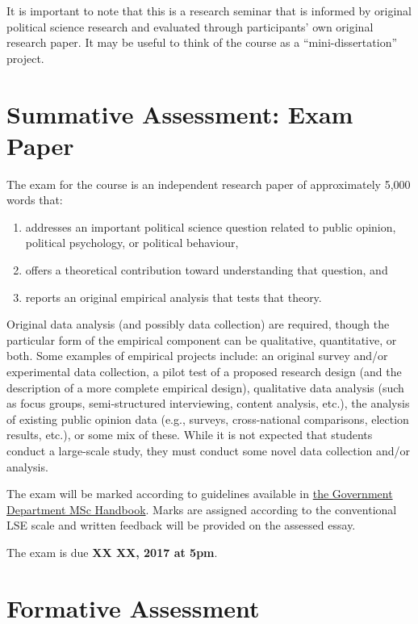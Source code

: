 \documentclass[12pt,a4paper]{article}
\begin{document}
\noindent It is important to note that this is a research seminar that is informed by original political science research and evaluated through participants' own original research paper. It may be useful to think of the course as a ``mini-dissertation'' project.

\section{Summative Assessment: Exam Paper}

The exam for the course is an independent research paper of approximately 5,000 words that:

\begin{enumerate}
\item addresses an important political science question related to public opinion, political psychology, or political behaviour,
\item offers a theoretical contribution toward understanding that question, and 
\item reports an original empirical analysis that tests that theory.
\end{enumerate}

Original data analysis (and possibly data collection) are required, though the particular form of the empirical component can be qualitative, quantitative, or both. Some examples of empirical projects include: an original survey and/or experimental data collection, a pilot test of a proposed research design (and the description of a more complete empirical design), qualitative data analysis (such as focus groups, semi-structured interviewing, content analysis, etc.), the analysis of existing public opinion data (e.g., surveys, cross-national comparisons, election results, etc.), or some mix of these. While it is not expected that students conduct a large-scale study, they must conduct some novel data collection and/or analysis.

The exam will be marked according to guidelines available in \href{http://www.lse.ac.uk/government/degreeProgrammes/programmes/masters/MSc-Handbook-2015-6.pdf}{the Government Department MSc Handbook}. Marks are assigned according to the conventional LSE scale and written feedback will be provided on the assessed essay.

\vspace{1em}

\noindent The exam is due \textbf{XX XX, 2017 at 5pm}.


\section{Formative Assessment}
\end{document}

